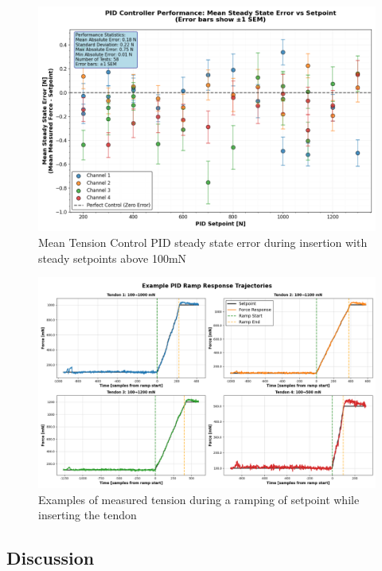 \begin{figure} [H]
    \centering
    \includegraphics[width=0.9\linewidth]{images/PID performance/Figure_1.png}
    \caption{Mean Tension Control PID steady state error during insertion with steady setpoints above 100mN}
    \label{fig:steadtyStatePIDError}
\end{figure}

\begin{figure} [H]
    \centering
    \includegraphics[width=\linewidth]{images/PID performance/rampExamples.png}
    \caption{Examples of measured tension during a ramping of setpoint while inserting the tendon}
    \label{fig:rampresponse}
\end{figure}

\subsection{Discussion}
